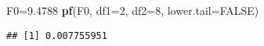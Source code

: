 \documentclass[
]{article}
\newenvironment{Shaded}{\begin{snugshade}}{\end{snugshade}}
\newcommand{\DataTypeTok}[1]{\textcolor[rgb]{0.13,0.29,0.53}{#1}}
\newcommand{\DecValTok}[1]{\textcolor[rgb]{0.00,0.00,0.81}{#1}}
\newcommand{\FloatTok}[1]{\textcolor[rgb]{0.00,0.00,0.81}{#1}}
\newcommand{\KeywordTok}[1]{\textcolor[rgb]{0.13,0.29,0.53}{\textbf{#1}}}
\newcommand{\NormalTok}[1]{#1}
\newcommand{\OtherTok}[1]{\textcolor[rgb]{0.56,0.35,0.01}{#1}}
\begin{document}
\begin{Shaded}
\begin{Highlighting}[]
\NormalTok{F0=}\FloatTok{9.4788}
\KeywordTok{pf}\NormalTok{(F0, }\DataTypeTok{df1=}\DecValTok{2}\NormalTok{, }\DataTypeTok{df2=}\DecValTok{8}\NormalTok{, }\DataTypeTok{lower.tail=}\OtherTok{FALSE}\NormalTok{)}
\end{Highlighting}
\end{Shaded}

\begin{verbatim}
## [1] 0.007755951
\end{verbatim}
\end{document}
